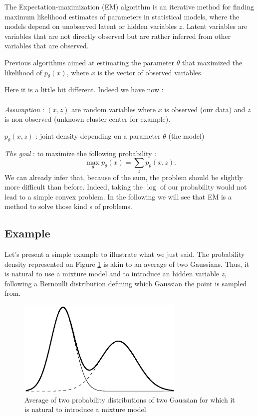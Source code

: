 \documentclass[12pt]{report}
\begin{document}
The Expectation-maximization  (EM) algorithm is an iterative method for finding maximum likelihood estimates of parameters in statistical models, where the models depend on unobserved latent or hidden variables $z$. Latent variables are variables that are not directly observed but are rather inferred from other variables that are observed.

Previous algorithms aimed at estimating the parameter $\theta$ that maximized the likelihood of $p_{\theta}(x)$, where $x$ is the vector of observed variables.

Here it is a little bit different. Indeed we have now :
\\ \\
\textit{Assumption} : $(x,z)$ are random variables where $x$ is observed (our data) and $z$ is non observed (unknown cluster center for example).
\begin{center}
$ p_{\theta}(x,z)$ : joint density depending on a parameter $\theta$ (the model)
\end{center}
\textit{The goal} : to maximize the following probability  :
\begin{equation*}
\max_{\theta} p_{\theta}(x) = \sum_zp_{\theta}(x,z).
\end{equation*}
We can already infer that, because of the sum, the problem should be slightly more difficult than before. Indeed, taking the $\log$ of our probability would not lead to a simple convex problem. In the following we will see that EM is a method to solve those kind s of problems.

\subsection{Example}

Let's present a simple example to illustrate what we just said. The probability density represented on Figure \ref{EM01} is akin to an average of two Gaussians. Thus, it is natural to use a mixture model and to introduce an hidden variable $z$, following a Bernoulli distribution defining which Gaussian the point is sampled from.

\begin{figure}[ht]
  \label{EM01}
  \centering
  \includegraphics[width=8cm]{./figures/EM01.eps}
  \caption{Average of two probability distributions of two Gaussian for which it is natural to introduce a mixture model}
\end{figure}
\end{document}
